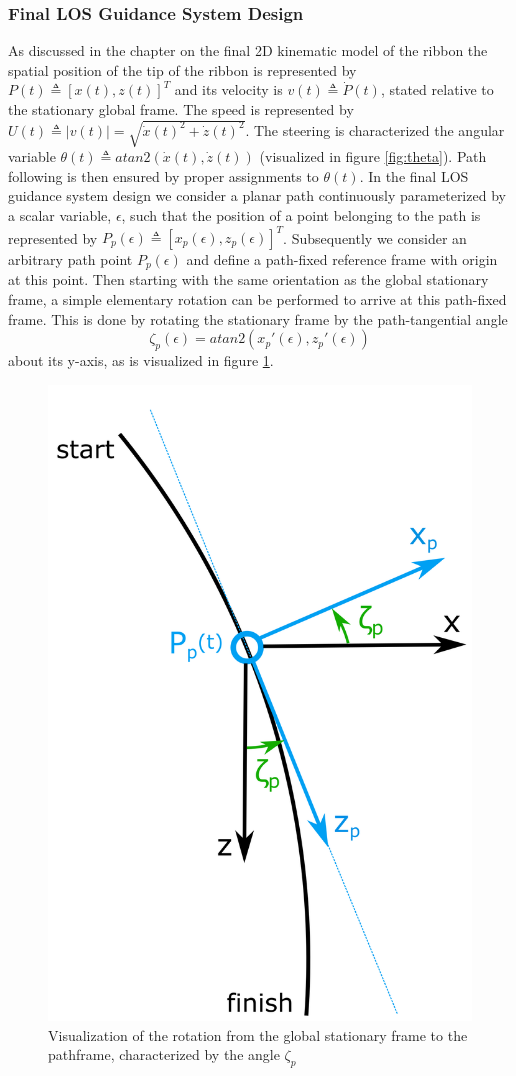 \subsubsection{Final LOS Guidance System Design}
As discussed in the chapter on the final 2D kinematic model of the ribbon the spatial position of the tip of the ribbon is represented by \(P(t) \triangleq [x(t), z(t)]^T\) and its velocity is \(v(t) \triangleq \dot{P}(t)\), stated relative to the stationary global frame. The speed is represented by \(U(t) \triangleq |v(t)| = \sqrt{\dot{x}(t)^2 + \dot{z}(t)^2}\). The steering is characterized the angular variable \(\theta(t) \triangleq atan2(\dot{x}(t), \dot{z}(t))\) (visualized in figure \ref{fig:theta}). Path following is then ensured by proper assignments to \(\theta(t)\).
\newline \newline
In the final LOS guidance system design we consider a planar path continuously parameterized by a scalar variable, \(\epsilon\), such that the position of a point belonging to the path is represented by \(P_p(\epsilon) \triangleq [x_p(\epsilon), z_p(\epsilon)]^T\). Subsequently we consider an arbitrary path point \(P_p(\epsilon)\) and define a path-fixed reference frame with origin at this point. Then starting with the same orientation as the global stationary frame, a simple elementary rotation can be performed to arrive at this path-fixed frame. This is done by rotating the stationary frame by the path-tangential angle
\begin{equation}
    \zeta_p(\epsilon) = atan2(x_p'(\epsilon), z_p'(\epsilon))
\end{equation}
about its y-axis, as is visualized in figure \ref{fig:pathframerotation}.

\begin{figure} [H]
    \centering
    \includegraphics[width=0.4\linewidth]{images/inkscape/pathframeRotatione.png}
    \caption{Visualization of the rotation from the global stationary frame to the pathframe, characterized by the angle \(\zeta_p\)}
    \label{fig:pathframerotation}
\end{figure}

